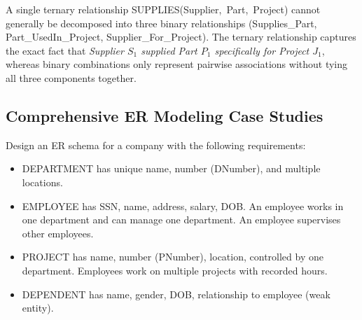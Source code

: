 \documentclass[11pt,a4paper]{article}
\newcommand{\ic}[1]{\mbox{\colorbox{AnthCodeBG}{\footnotesize\ttfamily\textcolor{AnthBlue}{#1}}}}
\newenvironment{Warn}[1][Important Exam Alert]{\begin{tcolorbox}[warnbox, title=#1]}{\end{tcolorbox}}
\newenvironment{Problem}[1][Problem Scenario]{\begin{tcolorbox}[problembox, title=#1]}{\end{tcolorbox}}
\begin{document}
\begin{center}
\end{center}

\begin{Warn}[Ternary Relationship vs. Three Binary Relationships]
A single ternary relationship \ic{SUPPLIES(Supplier, Part, Project)} cannot generally be decomposed into three binary relationships (\ic{Supplies\_Part}, \ic{Part\_UsedIn\_Project}, \ic{Supplier\_For\_Project}). The ternary relationship captures the exact fact that \emph{Supplier $S_1$ supplied Part $P_1$ specifically for Project $J_1$}, whereas binary combinations only represent pairwise associations without tying all three components together.
\end{Warn}

\clearpage
\subsection{Comprehensive ER Modeling Case Studies}

\begin{Problem}[Case Study 1: Enterprise Company Database]
Design an ER schema for a company with the following requirements:
\begin{itemize}
  \item \ic{DEPARTMENT} has unique name, number (\ic{DNumber}), and multiple locations.
  \item \ic{EMPLOYEE} has \ic{SSN}, name, address, salary, DOB. An employee works in one department and can manage one department. An employee supervises other employees.
  \item \ic{PROJECT} has name, number (\ic{PNumber}), location, controlled by one department. Employees work on multiple projects with recorded hours.
  \item \ic{DEPENDENT} has name, gender, DOB, relationship to employee (weak entity).
\end{itemize}
\end{Problem}
\end{document}
